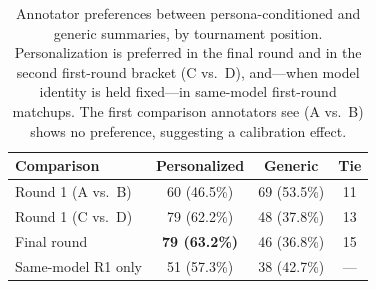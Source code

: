 \begin{table}[h]
\centering
\small
\begin{tabular}{lccc}
\toprule
\textbf{Comparison} & \textbf{Personalized} & \textbf{Generic} & \textbf{Tie} \\
\midrule
Round 1 (A vs.\ B) & 60 (46.5\%) & 69 (53.5\%) & 11 \\
Round 1 (C vs.\ D) & 79 (62.2\%) & 48 (37.8\%) & 13 \\
Final round         & \textbf{79 (63.2\%)} & 46 (36.8\%) & 15 \\
\midrule
Same-model R1 only  & 51 (57.3\%) & 38 (42.7\%) & --- \\
\bottomrule
\end{tabular}
\caption{Annotator preferences between persona-conditioned and generic summaries, by tournament position. Personalization is preferred in the final round and in the second first-round bracket (C vs.\ D), and---when model identity is held fixed---in same-model first-round matchups. The first comparison annotators see (A vs.\ B) shows no preference, suggesting a calibration effect.}
\label{tab:personalization}
\end{table}